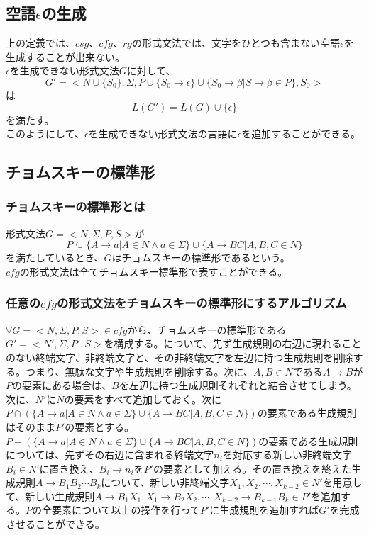 \documentclass[a4paper]{jarticle}
\begin{document}
\subsection{空語$ \epsilon $の生成}
上の定義では、$csg$、$cfg$、$rg$の形式文法では、文字をひとつも含まない空語$ \epsilon $を生成することが出来ない。\\
$ \epsilon $を生成できない形式文法$G$に対して、
\begin{equation}
G' = < N \cup \bigl\{ S_0 \bigr\} , \Sigma , P \cup \bigl\{ S_0 \to \epsilon \bigr\} \cup \bigl\{ S_0 \to \beta | S \to \beta \in P \bigr\} , S_0 >
\end{equation}
は
\begin{equation}
L \left( G' \right) = L \left( G \right) \cup \bigl\{ \epsilon \bigr\}
\end{equation}
を満たす。\\
このようにして、$ \epsilon $を生成できない形式文法の言語に$ \epsilon $を追加することができる。
\subsection{チョムスキーの標準形}
\subsubsection{チョムスキーの標準形とは}
形式文法$ G = < N , \Sigma , P , S > $が
\begin{equation}
P \subseteq \bigl\{ A \to a | A \in N \land a \in \Sigma \bigr\} \cup \bigl\{ A \to BC | A , B , C \in N \bigr\}
\end{equation}
を満たしているとき、$ G $はチョムスキーの標準形であるという。\\
$cfg$の形式文法は全てチョムスキー標準形で表すことができる。\\
\subsubsection{任意の$cfg$の形式文法をチョムスキーの標準形にするアルゴリズム}
$ \forall G = < N , \Sigma , P , S > \in cfg $から、チョムスキーの標準形である$ G' = < N' , \Sigma , P' , S > $を構成する。について、先ず生成規則の右辺に現れることのない終端文字、非終端文字と、その非終端文字を左辺に持つ生成規則を削除する。つまり、無駄な文字や生成規則を削除する。次に、$ A , B \in N $である$ A \to B $が$ P $の要素にある場合は、$ B $を左辺に持つ生成規則それぞれと結合させてしまう。次に、$ N' $に$N$の要素をすべて追加しておく。次に$ P \cap \left( \bigl\{ A \to a | A \in N \land a \in \Sigma \bigr\} \cup \bigl\{ A \to BC | A , B , C \in N \bigr\} \right) $の要素である生成規則はそのまま$ P' $の要素とする。$ P - \left( \bigl\{ A \to a | A \in N \land a \in \Sigma \bigr\} \cup \bigl\{ A \to BC | A , B , C \in N \bigr\} \right) $の要素である生成規則については、先ずその右辺に含まれる終端文字$ n_i $を対応する新しい非終端文字$ B_i \in N' $に置き換え、$B_i \to n_i $を$ P' $の要素として加える。その置き換えを終えた生成規則$ A \to B_1 B_2 \cdots B_k $について、新しい非終端文字$ X_1 , X_2 , \cdots , X_{ k - 2 } \in N' $を用意して、新しい生成規則$ A \to B_1 X_1 , X_1 \to B_2 X_2 , \cdots , X_{ k - 2 } \to B_{ k - 1 } B_k \in P' $を追加する。$ P $の全要素について以上の操作を行って$ P' $に生成規則を追加すれば$ G' $を完成させることができる。
\end{document}
